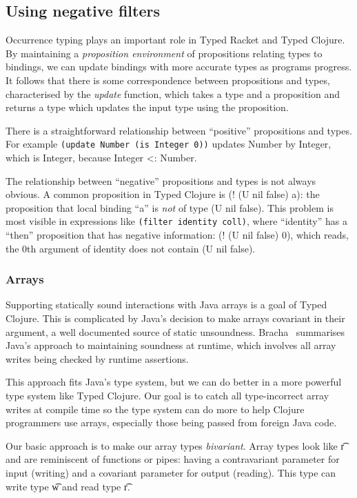 \subsection{Using negative filters}

Occurrence typing plays an important role in Typed Racket and Typed Clojure.
By maintaining a \emph{proposition environment} of propositions relating types to
bindings, we can update bindings with more accurate types as programs progress.
It follows that there is some correspondence between propositions and types,
characterised by the \emph{update} function, which takes a type and a proposition
and returns a type which updates the input type using the proposition.

There is a straightforward relationship between ``positive'' propositions and types.
For example 
{\tt (update Number (is Integer 0))}
updates Number by Integer, which is Integer, because Integer <: Number.

The relationship between ``negative'' propositions and types is not always obvious.
A common proposition in Typed Clojure is (! (U nil false) a): the proposition that
local binding ``a'' is \emph{not} of type (U nil false).
This problem is most visible in expressions like {\tt (filter identity coll)}, where
``identity'' has a ``then'' proposition that has negative information: (! (U nil false) 0),
which reads, the 0th argument of identity does not contain (U nil false).

\subsubsection{Arrays}
\label{sec:arrays}

Supporting statically sound interactions with Java arrays is a goal
of Typed Clojure. This is complicated by Java's decision to make
arrays covariant in their argument, a well documented source of static
unsoundness. Bracha~\cite{Bra98} summarises Java's approach to maintaining
soundness at runtime, which involves all array writes being checked by
runtime assertions.

This approach fits Java's type system, but we can do better in a more powerful
type system like Typed Clojure. Our goal is to catch all type-incorrect array
writes at compile time so the type system can do more to help Clojure programmers
use arrays, especially those being passed from foreign Java code.

Our basic approach is to make our array types \emph{bivariant}. Array types
look like { {\t{r}}} and
are reminiscent of functions or pipes: having a contravariant parameter for input (writing)
and a covariant parameter for output (reading).
This type can write type {\t{w}} and read type {\t{r}}.

